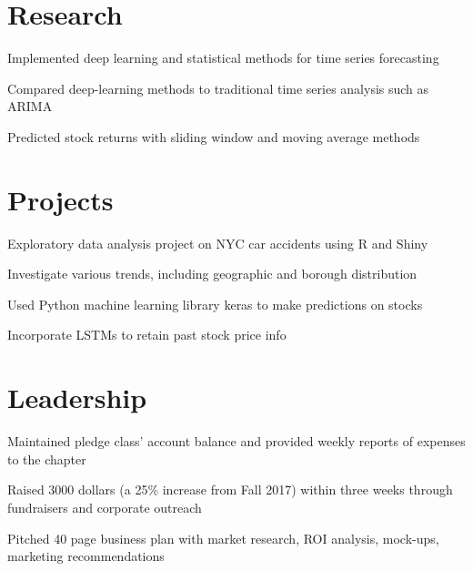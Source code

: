 \documentclass[]{deedy-resume-openfont}
\begin{document}
\begin{minipage}[t]{0.66\textwidth}
\section{Research}
\begin{tightemize} 
\item Implemented deep learning and statistical methods for time series forecasting
\item Compared deep-learning methods to traditional time series analysis such as ARIMA
\item Predicted stock returns with sliding window and moving average methods
\end{tightemize}
\sectionsep


\section{Projects}
\location{}
\begin{tightemize} 
\item Exploratory data analysis project on NYC car accidents using R and Shiny
\item Investigate various trends, including geographic and borough distribution
\end{tightemize}
\location{}
\begin{tightemize} 
\item Used Python machine learning library keras to make predictions on stocks
\item Incorporate LSTMs to retain past stock price info
\end{tightemize}
\sectionsep


\section{Leadership}
\begin{tightemize} 
\item Maintained pledge class’ account balance and provided weekly reports of expenses to the chapter
\item Raised 3000 dollars (a 25\% increase from Fall 2017) within three weeks through fundraisers and corporate outreach
\item Pitched 40 page business plan with market research, ROI analysis, mock-ups, marketing recommendations
\end{tightemize}
\sectionsep



\end{minipage} 
\end{document}
